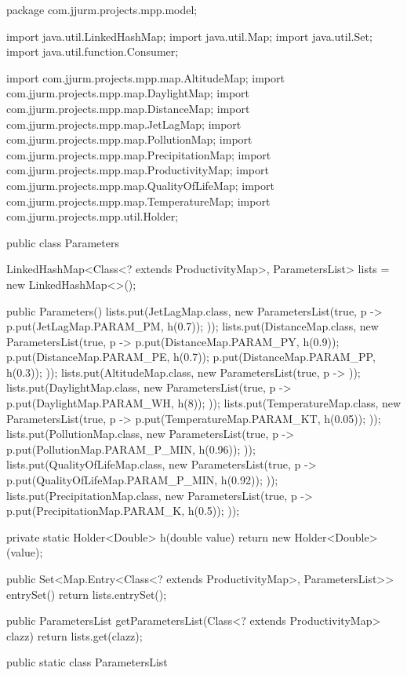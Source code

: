 \begin{javacode}
package com.jjurm.projects.mpp.model;

import java.util.LinkedHashMap;
import java.util.Map;
import java.util.Set;
import java.util.function.Consumer;

import com.jjurm.projects.mpp.map.AltitudeMap;
import com.jjurm.projects.mpp.map.DaylightMap;
import com.jjurm.projects.mpp.map.DistanceMap;
import com.jjurm.projects.mpp.map.JetLagMap;
import com.jjurm.projects.mpp.map.PollutionMap;
import com.jjurm.projects.mpp.map.PrecipitationMap;
import com.jjurm.projects.mpp.map.ProductivityMap;
import com.jjurm.projects.mpp.map.QualityOfLifeMap;
import com.jjurm.projects.mpp.map.TemperatureMap;
import com.jjurm.projects.mpp.util.Holder;

public class Parameters {

  LinkedHashMap<Class<? extends ProductivityMap>, ParametersList> lists = new LinkedHashMap<>();

  public Parameters() {
    lists.put(JetLagMap.class, new ParametersList(true, p -> {
      p.put(JetLagMap.PARAM_PM, h(0.7));
    }));
    lists.put(DistanceMap.class, new ParametersList(true, p -> {
      p.put(DistanceMap.PARAM_PY, h(0.9));
      p.put(DistanceMap.PARAM_PE, h(0.7));
      p.put(DistanceMap.PARAM_PP, h(0.3));
    }));
    lists.put(AltitudeMap.class, new ParametersList(true, p -> {
    }));
    lists.put(DaylightMap.class, new ParametersList(true, p -> {
      p.put(DaylightMap.PARAM_WH, h(8));
    }));
    lists.put(TemperatureMap.class, new ParametersList(true, p -> {
      p.put(TemperatureMap.PARAM_KT, h(0.05));
    }));
    lists.put(PollutionMap.class, new ParametersList(true, p -> {
      p.put(PollutionMap.PARAM_P_MIN, h(0.96));
    }));
    lists.put(QualityOfLifeMap.class, new ParametersList(true, p -> {
      p.put(QualityOfLifeMap.PARAM_P_MIN, h(0.92));
    }));
    lists.put(PrecipitationMap.class, new ParametersList(true, p -> {
      p.put(PrecipitationMap.PARAM_K, h(0.5));
    }));
  }

  private static Holder<Double> h(double value) {
    return new Holder<Double>(value);
  }

  public Set<Map.Entry<Class<? extends ProductivityMap>, ParametersList>> entrySet() {
    return lists.entrySet();
  }

  public ParametersList getParametersList(Class<? extends ProductivityMap> clazz) {
    return lists.get(clazz);
  }

  public static class ParametersList {

}}
\end{javacode}
